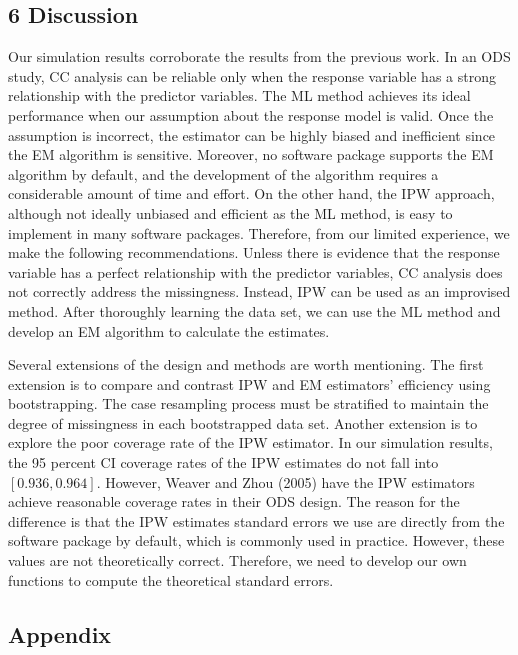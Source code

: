 \documentclass[
  12pt,
]{article}
\begin{document}
\hypertarget{discussion}{%
\subsection{6 Discussion}\label{discussion}}

Our simulation results corroborate the results from the previous work.
In an ODS study, CC analysis can be reliable only when the response
variable has a strong relationship with the predictor variables. The ML
method achieves its ideal performance when our assumption about the
response model is valid. Once the assumption is incorrect, the estimator
can be highly biased and inefficient since the EM algorithm is
sensitive. Moreover, no software package supports the EM algorithm by
default, and the development of the algorithm requires a considerable
amount of time and effort. On the other hand, the IPW approach, although
not ideally unbiased and efficient as the ML method, is easy to
implement in many software packages. Therefore, from our limited
experience, we make the following recommendations. Unless there is
evidence that the response variable has a perfect relationship with the
predictor variables, CC analysis does not correctly address the
missingness. Instead, IPW can be used as an improvised method. After
thoroughly learning the data set, we can use the ML method and develop
an EM algorithm to calculate the estimates.

Several extensions of the design and methods are worth mentioning. The
first extension is to compare and contrast IPW and EM estimators'
efficiency using bootstrapping. The case resampling process must be
stratified to maintain the degree of missingness in each bootstrapped
data set. Another extension is to explore the poor coverage rate of the
IPW estimator. In our simulation results, the 95 percent CI coverage
rates of the IPW estimates do not fall into \([0.936, 0.964]\). However,
Weaver and Zhou (2005) have the IPW estimators achieve reasonable
coverage rates in their ODS design. The reason for the difference is
that the IPW estimates standard errors we use are directly from the
software package by default, which is commonly used in practice.
However, these values are not theoretically correct. Therefore, we need
to develop our own functions to compute the theoretical standard errors.

\hypertarget{appendix}{%
\subsection{Appendix}\label{appendix}}
\end{document}
